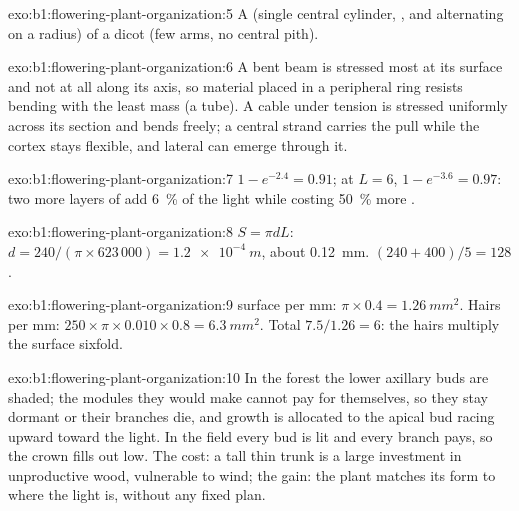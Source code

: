 \begin{solution}{exo:b1:flowering-plant-organization:5}
A  (single central cylinder, ,  and 
alternating on a radius) of a dicot (few  arms, no central pith).
\end{solution}

\begin{solution}{exo:b1:flowering-plant-organization:6}
A bent beam is stressed most at its surface and not at all along its
axis, so material placed in a peripheral ring resists bending with the
least mass (a tube). A cable under tension is stressed uniformly across
its section and bends freely; a central strand carries the pull while
the cortex stays flexible, and lateral  can emerge through it.
\end{solution}

\begin{solution}{exo:b1:flowering-plant-organization:7}
$1 - e^{-2.4} = 0.91$; at $L = 6$, $1 - e^{-3.6} = 0.97$: two more
layers of  add \qty{6}{\%} of the light while costing \qty{50}{\%}
more .
\end{solution}

\begin{solution}{exo:b1:flowering-plant-organization:8}
$S = \pi d L$: $d = 240/(\pi\times 623\,000) = \qty{1.2e-4}{m}$, about
\qty{0.12}{mm}. $(240 + 400)/5 = 128$.
\end{solution}

\begin{solution}{exo:b1:flowering-plant-organization:9}
 surface per mm: $\pi\times 0.4 = \qty{1.26}{mm^2}$. Hairs per mm:
$250\times\pi\times 0.010\times 0.8 = \qty{6.3}{mm^2}$. Total
$7.5/1.26 = 6$: the hairs multiply the surface sixfold.
\end{solution}

\begin{solution}{exo:b1:flowering-plant-organization:10}
In the forest the lower axillary buds are shaded; the modules they
would make cannot pay for themselves, so they stay dormant or their
branches die, and growth is allocated to the apical bud racing upward
toward the light. In the field every bud is lit and every branch pays,
so the crown fills out low. The cost: a tall thin trunk is a large
investment in unproductive wood, vulnerable to wind; the gain: the plant
matches its form to where the light is, without any fixed plan.
\end{solution}

